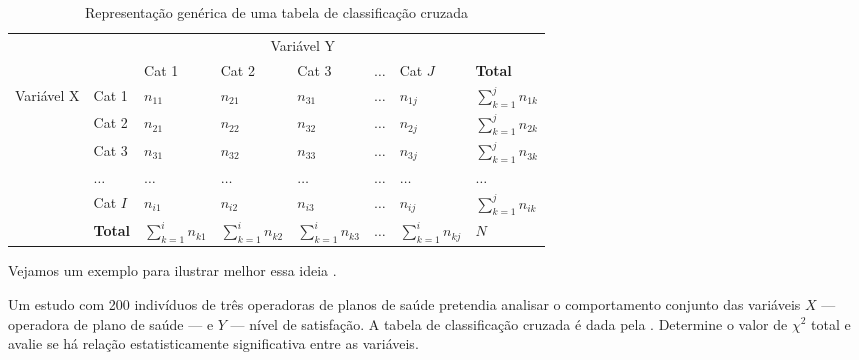 \begin{table}[htpb]
\centering
\begin{tabular}{llllllll}
    \toprule
               &          & \multicolumn{5}{c}{Variável Y} & \\
               \cmidrule(lr){3-7}
               &          & Cat 1         & Cat 2    & Cat 3    & $\ldots$ & Cat $J$  & \textbf{Total} \\
               \midrule
    \multirow{5}{*}{Variável X} & Cat 1    & $n_{11}$ & $n_{21}$ & $n_{31}$ & $\ldots$ & $n_{1j}$ & $\sum_{k=1}^{j} n_{1k}$ \\
                                & Cat 2    & $n_{21}$ & $n_{22}$ & $n_{32}$ & $\ldots$ & $n_{2j}$ & $\sum_{k=1}^{j} n_{2k}$ \\
                                & Cat 3    & $n_{31}$ & $n_{32}$ & $n_{33}$ & $\ldots$ & $n_{3j}$ & $\sum_{k=1}^{j} n_{3k}$ \\
                                & $\ldots$ & $\ldots$ & $\ldots$ & $\ldots$ & $\ldots$ & $\ldots$ & $\ldots$ \\
                                & Cat $I$  & $n_{i1}$ & $n_{i2}$ & $n_{i3}$ & $\ldots$ & $n_{ij}$ & $\sum_{k=1}^{j} n_{ik}$ \\
               \midrule
               & \textbf{Total} & $\sum_{k=1}^{i} n_{k1}$ & $\sum_{k=1}^{i} n_{k2}$ & $\sum_{k=1}^{i} n_{k3}$ & $\ldots$ & $\sum_{k=1}^{i} n_{kj}$ & $N$\\
    \bottomrule
\end{tabular}
\caption{Representação genérica de uma tabela de classificação cruzada}
\label{tab:rep-tab-class-cruzada}
\end{table}

Vejamos um exemplo para ilustrar melhor essa ideia \parencite[p.~224]{favero}.

\begin{eg}
Um estudo com 200 indivíduos de três operadoras de planos de saúde pretendia
analisar o comportamento conjunto das variáveis $X$ --- operadora de plano de
saúde --- e $Y$ --- nível de satisfação. A tabela de classificação cruzada é
dada pela . Determine o valor de $\chi^2$ total
e avalie se há relação estatisticamente significativa entre as variáveis.
\label{eg:operadoras-saude}
\end{eg}

